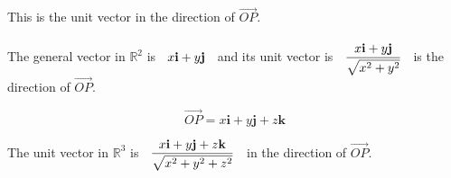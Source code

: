 \documentclass[11pt,a4paper]{article}
\begin{document}
This is the unit vector in the direction of $\overrightarrow{OP}$.\\\\


The general vector in $\mathbb{R}^2$ is $\hspace{0.2cm} x\textbf{i} + y \textbf{j}\hspace{0.2cm}$ and its unit vector is $\hspace{0.2cm}\dfrac{x\textbf{i} + y \textbf{j}}{\sqrt{x^2 + y^2}}\hspace{0.2cm}$ is the direction of $\overrightarrow{OP}$.



\begin{figure}[H]
\centering
{}
\end{figure}














$$\overrightarrow{OP} =  x\textbf{i} + y \textbf{j} +  z\textbf{k}$$ 


The unit vector in $\mathbb{R}^3$ is $\hspace{0.2cm}\dfrac{x\textbf{i} + y \textbf{j} +  z\textbf{k}}{\sqrt{x^2 + y^2 + z^2}}\hspace{0.2cm}$ in the direction of $\overrightarrow{OP}$.\\\\
\end{document}
